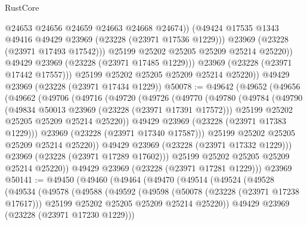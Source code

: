 \begin{lexlean}{RustCore}
\begin{coremodule}
                      @24653
                      @24656
                      @24659
                      @24663
                      @24668
                      @24674))
                  (@49424 @17535 @1343 @49416 @49429 @23969 (@23228 (@23971 @17536 @1229)))
                  @23969
                  (@23228 (@23971 @17493 @17542)))
                @25199
                @25202
                @25205
                @25209
                @25214
                @25220))
            @49429
            @23969
            (@23228 (@23971 @17485 @1229)))
          @23969
          (@23228 (@23971 @17442 @17557)))
        @25199
        @25202
        @25205
        @25209
        @25214
        @25220))
    @49429
    @23969
    (@23228 (@23971 @17434 @1229))
@50078 := @49642
    (@49652
      (@49656
        (@49662
          (@49706
            (@49716
              (@49720
                (@49726
                  (@49770
                    (@49780
                      (@49784
                        (@49790
                          (@49834 @50013 @23969 (@23228 (@23971 @17391 @17572)))
                          @25199
                          @25202
                          @25205
                          @25209
                          @25214
                          @25220))
                      @49429
                      @23969
                      (@23228 (@23971 @17383 @1229)))
                    @23969
                    (@23228 (@23971 @17340 @17587)))
                  @25199
                  @25202
                  @25205
                  @25209
                  @25214
                  @25220))
              @49429
              @23969
              (@23228 (@23971 @17332 @1229)))
            @23969
            (@23228 (@23971 @17289 @17602)))
          @25199
          @25202
          @25205
          @25209
          @25214
          @25220))
      @49429
      @23969
      (@23228 (@23971 @17281 @1229)))
    @23969
@50141 := @49450
    (@49460
      (@49464
        (@49470
          (@49514
            (@49524
              (@49528
                (@49534
                  (@49578
                    (@49588
                      (@49592
                        (@49598
                          (@50078 (@23228 (@23971 @17238 @17617)))
                          @25199
                          @25202
                          @25205
                          @25209
                          @25214
                          @25220))
                      @49429
                      @23969
                      (@23228 (@23971 @17230 @1229)))

\end{coremodule}
\end{lexlean}
